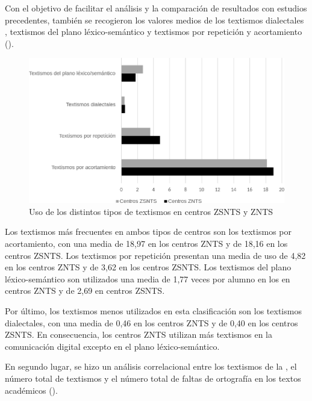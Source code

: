 \documentclass[spanish]{textolivre}
\begin{document}
Con el objetivo de facilitar el análisis y la comparación de resultados con estudios precedentes, también se recogieron los valores medios de los textismos dialectales \cite{gomez-camacho_ke_2023a}, textismos del plano léxico-semántico \cite{gomez-camacho_youth_2023b} y textismos por repetición \cite{verheijen_orthographic_2018} y acortamiento \cite{adams2023examining} ().

\begin{figure}[htbp]
\centering
\begin{minipage}{.9\textwidth}
 \includegraphics[width=\textwidth]{Fig1.png}
 \caption{Uso de los distintos tipos de textismos en centros ZSNTS y ZNTS}
 \label{fig1}
\end{minipage}
\end{figure}

Los textismos más frecuentes en ambos tipos de centros son los textismos por acortamiento, con una media de 18,97 en los centros ZNTS y de 18,16 en los centros ZSNTS. Los textismos por repetición presentan una media de uso de 4,82 en los centros ZNTS y de 3,62 en los centros ZSNTS. Los textismos del plano léxico-semántico son utilizados una media de 1,77 veces por alumno en los en centros ZNTS y de 2,69 en centros ZSNTS.

Por último, los textismos menos utilizados en esta clasificación son los textismos dialectales, con una media de 0,46 en los centros ZNTS y de 0,40 en los centros ZSNTS. En consecuencia, los centros ZNTS utilizan más textismos en la comunicación digital excepto en el plano léxico-semántico.

En segundo lugar, se hizo un análisis correlacional entre los textismos de la , el número total de textismos y el número total de faltas de ortografía en los textos académicos (). 
\end{document}
